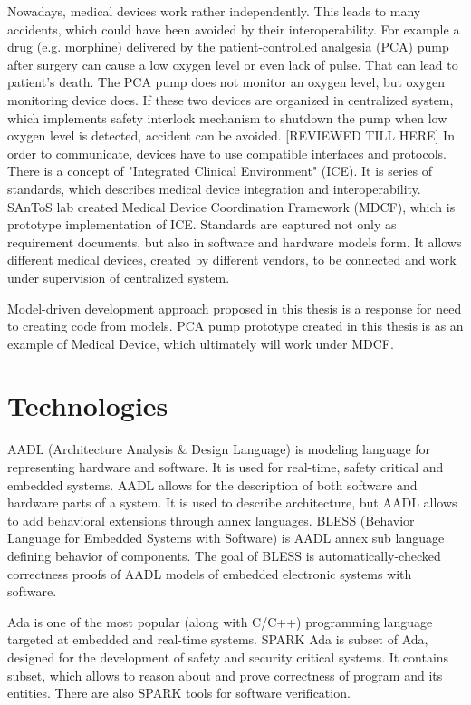 Nowadays, medical devices work rather independently. This leads to many accidents, which could have been avoided by their interoperability. For example a drug (e.g. morphine) delivered by the patient-controlled analgesia (PCA) pump after surgery can cause a low oxygen level or even lack of pulse. That can lead to patient's death. The PCA pump does not monitor an oxygen level, but oxygen monitoring device does. If these two devices are organized in centralized system, which implements safety interlock mechanism to shutdown the pump when low oxygen level is detected, accident can be avoided. 
[REVIEWED TILL HERE]
In order to communicate, devices have to use compatible interfaces and protocols. There is a concept of "Integrated Clinical Environment" (ICE). It is series of standards, which describes medical device integration and interoperability. SAnToS lab created Medical Device Coordination Framework (MDCF), which is prototype implementation of ICE. Standards are captured not only as requirement documents, but also in software and hardware models form. It allows different medical devices, created by different vendors, to be connected and work under supervision of centralized system.

Model-driven development approach proposed in this thesis is a response for need to creating code from models. PCA pump prototype created in this thesis is as an example of Medical Device, which ultimately will work under MDCF.


\section{Technologies}
\label{introduction:technologies}

AADL (Architecture Analysis \& Design Language) is modeling language for representing hardware and software. It is used for real-time, safety critical and embedded systems. AADL allows for the description of both software and hardware parts of a system. It is used to describe architecture, but AADL allows to add behavioral extensions through annex languages. BLESS (Behavior Language for Embedded Systems with Software) is AADL annex sub language defining behavior of components. The goal of BLESS is automatically-checked correctness proofs of AADL models of embedded electronic systems with software.

Ada is one of the most popular (along with C/C++) programming language targeted at embedded and real-time systems. SPARK Ada is subset of Ada, designed for the development of safety and security critical systems. It contains subset, which allows to reason about and prove correctness of program and its entities. There are also SPARK tools for software verification.

